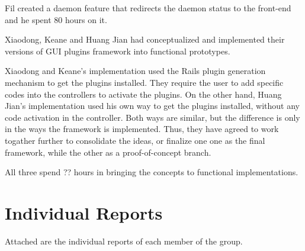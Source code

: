 \documentclass{article}
\begin{document}
Fil created a daemon feature that redirects the daemon status to the front-end and he spent 80 hours on it.

Xiaodong, Keane and Huang Jian had conceptualized and implemented their versions of GUI plugins framework into functional prototypes.

Xiaodong and Keane's implementation used the Rails plugin generation mechanism to get the plugins installed. They require the user to add specific codes into the controllers to activate the plugins. On the other hand, Huang Jian's implementation used his own way to get the plugins installed, without any code activation in the controller. Both ways are similar, but the difference is only in the ways the framework is implemented. Thus, they have agreed to work togather further to consolidate the ideas, or finalize one one as the final framework, while the other as a proof-of-concept branch. 

All three spend ?? hours in bringing the concepts to functional implementations. 
 
\section*{Individual Reports}

Attached are the individual reports of each member of the group. 














\end{document}
